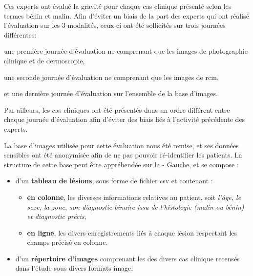 Ces experts ont évalué la gravité pour chaque cas clinique présenté selon les termes bénin et malin. Afin d'éviter un biais de la part des experts qui ont réalisé l'évaluation sur les 3 modalités, ceux-ci ont été sollicités sur trois journées différentes: 
\begin{inlinerate}
    \item une première journée d'évaluation ne comprenant que les images de photographie clinique et de dermoscopie,
    \item une seconde journée d'évaluation ne comprenant que les images de \gls{rcm},
    \item et une dernière journée d'évaluation sur l'ensemble de la base d'images.
\end{inlinerate}
Par ailleurs, les cas cliniques ont été présentés dans un ordre différent entre chaque journée d'évaluation afin d'éviter des biais liés à l'activité précédente des experts.\par

La base d'images utilisée pour cette évaluation nous été remise, et ses données sensibles ont été anonymisée afin de ne pas pouvoir ré-identifier les patients. La structure de cette base peut être appréhendée sur la  - Gauche, et se compose :
\begin{itemize}
    \item d'un \textbf{tableau de lésions}, sous forme de fichier \gls{csv} et contenant :
    \begin{itemize}
        \item \textbf{en colonne}, les diverses informations relatives au patient, soit \textit{l'âge, le sexe, la zone, son diagnostic binaire issu de l'histologie (malin ou bénin) et diagnostic précis},
        \item \textbf{en ligne}, les divers enregistrements liés à chaque lésion respectant les champs précisé en colonne.
    \end{itemize}
    \item d'un \textbf{répertoire d'images} comprenant les des divers cas clinique recensés dans l'étude sous divers formats image.
\end{itemize}\par

